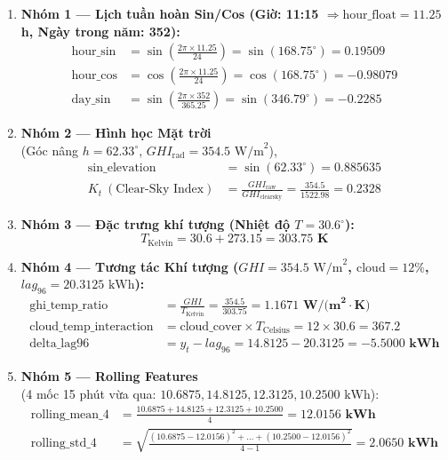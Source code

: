 \documentclass[12pt,a4paper]{article}
\begin{document}
\begin{enumerate}
    \item \textbf{Nhóm 1 --- Lịch tuần hoàn Sin/Cos (Giờ: 11:15 $\Rightarrow \text{hour\_float} = 11.25$h, Ngày trong năm: 352):}
    \begin{align}
        \text{hour\_sin} &= \sin\left(\frac{2\pi \times 11.25}{24}\right) = \sin(168.75^\circ) = \mathbf{0.19509} \\
        \text{hour\_cos} &= \cos\left(\frac{2\pi \times 11.25}{24}\right) = \cos(168.75^\circ) = \mathbf{-0.98079} \\
        \text{day\_sin} &= \sin\left(\frac{2\pi \times 352}{365.25}\right) = \sin(346.79^\circ) = \mathbf{-0.2285}
    \end{align}

\item \textbf{Nhóm 2 --- Hình học Mặt trời}\\(Góc nâng $h = 62.33^\circ$, $GHI_{\text{rad}} = 354.5\text{ W/m}^2$),
    \begin{align}
        \text{sin\_elevation} &= \sin(62.33^\circ) = \mathbf{0.885635} \\
        K_t \ (\text{Clear-Sky Index}) &= \frac{GHI_{\text{raw}}}{GHI_{\text{clearsky}}} = \frac{354.5}{1522.98} = \mathbf{0.2328}
    \end{align}

    \item \textbf{Nhóm 3 --- Đặc trưng khí tượng (Nhiệt độ $T = 30.6^\circ\text{}$):}
    \begin{equation}
        T_{\text{Kelvin}} = 30.6 + 273.15 = \mathbf{303.75 \text{ K}}
    \end{equation}

    \item \textbf{Nhóm 4 --- Tương tác Khí tượng ($GHI = 354.5 \text{ W/m}^2$, $\text{cloud} = 12\%$, $lag_{96} = 20.3125 \text{ kWh}$):}
    \begin{align}
        \text{ghi\_temp\_ratio} &= \frac{GHI}{T_{\text{Kelvin}}} = \frac{354.5}{303.75} = \mathbf{1.1671 \text{ W/(m}^2\cdot\text{K)}} \\
        \text{cloud\_temp\_interaction} &= \text{cloud\_cover} \times T_{\text{Celsius}} = 12 \times 30.6 = \mathbf{367.2} \\
        \text{delta\_lag96} &= y_t - lag_{96} = 14.8125 - 20.3125 = \mathbf{-5.5000 \text{ kWh}}
    \end{align}

    \item \textbf{Nhóm 5 --- Rolling Features}\\
(4 mốc 15 phút vừa qua: $10.6875, 14.8125, 12.3125, 10.2500 \text{ kWh}$):
    \begin{align}
        \text{rolling\_mean\_4} &= \frac{10.6875 + 14.8125 + 12.3125 + 10.2500}{4} = \mathbf{12.0156 \text{ kWh}} \\
        \text{rolling\_std\_4} &= \sqrt{\frac{(10.6875-12.0156)^2 + \dots + (10.2500-12.0156)^2}{4 - 1}} = \mathbf{2.0650 \text{ kWh}}
    \end{align}
\end{enumerate}
\end{document}
